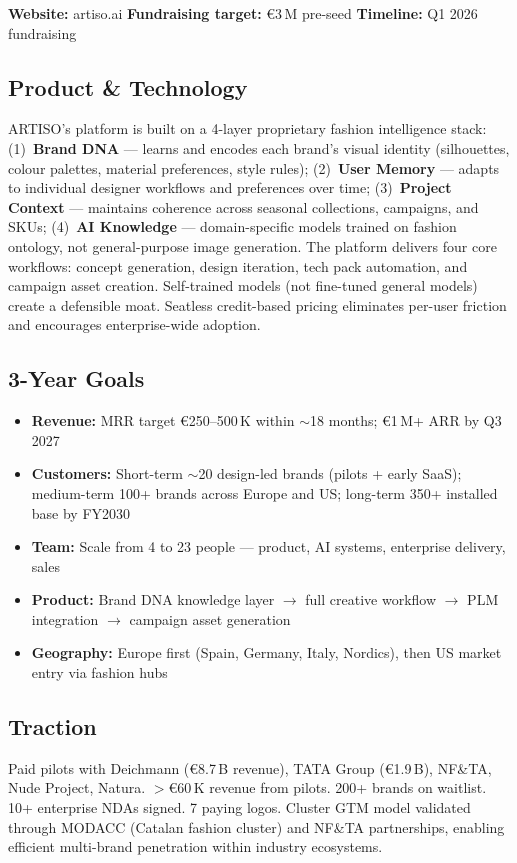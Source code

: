 \documentclass[11pt,a4paper]{article}
\begin{document}
\textbf{Website:} artiso.ai \quad \textbf{Fundraising target:} \euro{}3\,M pre-seed \quad \textbf{Timeline:} Q1 2026 fundraising

\subsection*{Product \& Technology}
ARTISO's platform is built on a 4-layer proprietary fashion intelligence stack: (1)~\textbf{Brand DNA} --- learns and encodes each brand's visual identity (silhouettes, colour palettes, material preferences, style rules); (2)~\textbf{User Memory} --- adapts to individual designer workflows and preferences over time; (3)~\textbf{Project Context} --- maintains coherence across seasonal collections, campaigns, and SKUs; (4)~\textbf{AI Knowledge} --- domain-specific models trained on fashion ontology, not general-purpose image generation. The platform delivers four core workflows: concept generation, design iteration, tech pack automation, and campaign asset creation. Self-trained models (not fine-tuned general models) create a defensible moat. Seatless credit-based pricing eliminates per-user friction and encourages enterprise-wide adoption.

\subsection*{3-Year Goals}
\begin{itemize}
\item \textbf{Revenue:} MRR target \euro{}250--500\,K within $\sim$18 months; \euro{}1\,M+ ARR by Q3 2027
\item \textbf{Customers:} Short-term $\sim$20 design-led brands (pilots + early SaaS); medium-term 100+ brands across Europe and US; long-term 350+ installed base by FY2030
\item \textbf{Team:} Scale from 4 to 23 people --- product, AI systems, enterprise delivery, sales
\item \textbf{Product:} Brand DNA knowledge layer $\rightarrow$ full creative workflow $\rightarrow$ PLM integration $\rightarrow$ campaign asset generation
\item \textbf{Geography:} Europe first (Spain, Germany, Italy, Nordics), then US market entry via fashion hubs
\end{itemize}

\subsection*{Traction}
Paid pilots with Deichmann (\euro{}8.7\,B revenue), TATA Group (\euro{}1.9\,B), NF\&TA, Nude Project, Natura. $>$\euro{}60\,K revenue from pilots. 200+ brands on waitlist. 10+ enterprise NDAs signed. 7 paying logos. Cluster GTM model validated through MODACC (Catalan fashion cluster) and NF\&TA partnerships, enabling efficient multi-brand penetration within industry ecosystems.
\end{document}
